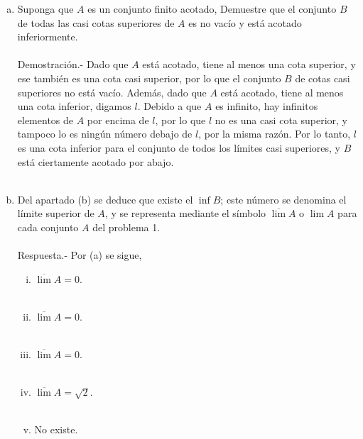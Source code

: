 \begin{enumerate}[\bfseries 1.]
\begin{enumerate}[(a)]
	    \item Suponga que $A$ es un conjunto finito acotado, Demuestre que el conjunto $B$ de todas las casi cotas superiores de $A$ es no vacío y está acotado inferiormente.\\\\
		Demostración.-\; Dado que $A$ está acotado, tiene al menos una cota superior, y ese también es una cota casi superior, por lo que el conjunto $B$ de cotas casi superiores no está vacío. Además, dado que $A$ está acotado, tiene al menos una cota  inferior, digamos $l$. Debido a que $A$ es infinito, hay infinitos elementos de $A$ por encima de $l$, por lo que $l$ no es una casi cota superior, y tampoco lo es ningún número debajo de $l$, por la misma razón. Por lo tanto, $l$ es una cota inferior para el conjunto de todos los límites casi superiores, y $B$ está ciertamente acotado por abajo.\\\\

	    \item Del apartado (b) se deduce que existe el $\inf B$; este número se denomina el límite superior de $A$, y se representa mediante el símbolo $\overline{\lim} A$ o $\lim A$ para cada conjunto $A$ del problema 1.\\\\
		Respuesta.-\; Por (a) se sigue,
		\begin{enumerate}[(i)]
		    
		    \item $\overline{\lim} A = 0$.\\\\

		    \item $\overline{\lim} A = 0$.\\\\

		    \item $\overline{\lim} A = 0$.\\\\

		    \item $\overline{\lim} A = \sqrt{2}$.\\\\

		    \item No existe.\\\\


\end{enumerate}
\end{enumerate}
\end{enumerate}
